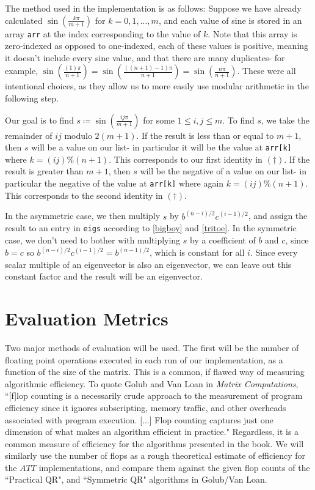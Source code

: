 \documentclass[10pt,twocolumn]{article}
\begin{document}
The method used in the implementation is as follows: Suppose we have already calculated $\sin(\frac{k\pi}{m+1})$ for $k=0,1,...,m$, and each value of sine is stored in an array \verb|arr| at the index corresponding to the value of $k$. Note that this array is zero-indexed as opposed to one-indexed, each of these values is positive, meaning it doesn't include every sine value, and that there are many duplicates- for example, $\sin(\frac{(1)\pi}{n+1})=\sin(\frac{((n+1)-1)\pi}{n+1})=\sin(\frac{n\pi}{n+1})$. These were all intentional choices, as they allow us to more easily use modular arithmetic in the following step.

Our goal is to find $s \coloneqq \sin(\frac{ij\pi}{m+1})$ for some $1\leq i,j\leq m$. To find $s$, we take the remainder of $ij$ modulo $2(m+1)$. If the result is less than or equal to $m+1$, then $s$ will be a value on our list- in particular it will be the value at \verb|arr[k]| where $k=(ij)\% (n+1)$. This corresponds to our first identity in $(\dagger)$. If the result is greater than $m+1$, then $s$ will be the negative of a value on our list- in particular the negative of the value at \verb|arr[k]| where again $k=(ij) \% (n+1)$. This corresponds to the second identity in $(\dagger)$.

In the asymmetric case, we then multiply $s$ by $b^{(n-i)/2}c^{(i-1)/2}$, and assign the result to an entry in \verb|eigs| according to \ref{bigboy} and \ref{tritoe}. In the symmetric case, we don't need to bother with multiplying $s$ by a coefficient of $b$ and $c$, since $b=c$ so $b^{(n-i)/2}c^{(i-1)/2}=b^{(n-1)/2}$, which is constant for all $i$. Since every scalar multiple of an eigenvector is also an eigenvector, we can leave out this constant factor and the result will be an eigenvector.

\section{Evaluation Metrics}

Two major methods of evaluation will be used. The first will be the number of floating point operations executed in each run of our implementation, as a function of the size of the matrix. This is a common, if flawed way of measuring algorithmic efficiency. To quote Golub and Van Loan in \textit{Matrix Computations}, ``[f]lop counting is a necessarily crude approach to the measurement of program efficiency since it ignores subscripting, memory traffic, and other overheads associated with program execution. {[...]} Flop counting captures just one dimension of what makes an algorithm efficient in practice."\cite[p.~17]{Golub_Van_Loan_2013} Regardless, it is a common measure of efficiency for the algorithms presented in the book. We will similarly use the number of flops as a rough theoretical estimate of efficiency for the $ATT$ implementations, and compare them against the given flop counts of the ``Practical QR", and ``Symmetric QR" algorithms in Golub/Van Loan.
\end{document}
